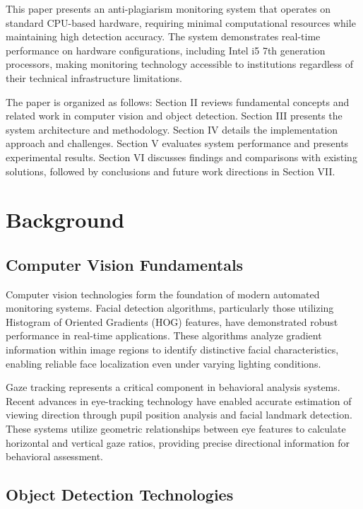 \documentclass[conference]{IEEEtran}
\begin{document}
This paper presents an anti-plagiarism monitoring system that operates 
on standard CPU-based hardware, requiring minimal computational resources 
while maintaining high detection accuracy. The system demonstrates 
real-time performance on hardware configurations, including Intel i5 7th 
generation processors, making monitoring technology accessible to institutions 
regardless of their technical infrastructure limitations.

The paper is organized as follows: Section II reviews fundamental 
concepts and related work in computer vision and object detection. Section III 
presents the system architecture and methodology. Section IV details the implementation 
approach and challenges. Section V evaluates system performance and presents experimental 
results. Section VI discusses findings and comparisons with existing solutions, 
followed by conclusions and future work directions in Section VII\@.

\section{Background}

\subsection{Computer Vision Fundamentals}

Computer vision technologies form the foundation of modern automated monitoring systems. 
Facial detection algorithms, particularly those utilizing Histogram of Oriented Gradients 
(HOG) features, have demonstrated robust performance in real-time applications\cite{hasan2021face}. 
These algorithms analyze gradient information within image regions to identify distinctive 
facial characteristics, enabling reliable face localization even under varying lighting conditions.

Gaze tracking represents a critical component in behavioral analysis systems. Recent advances 
in eye-tracking technology have enabled accurate estimation of viewing direction through 
pupil position analysis and facial landmark detection\cite{dilini2021cheating}. These systems 
utilize geometric relationships between eye features to calculate horizontal and vertical 
gaze ratios, providing precise directional information for behavioral assessment\cite{el2023drowsiness}.

\subsection{Object Detection Technologies}
\end{document}
